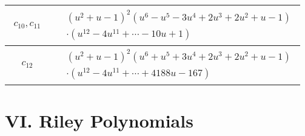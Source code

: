 \documentclass[1p]{elsarticle_modified}
\theoremstyle{definition}
\begin{document}
\begin{tabular}{m{50pt}|m{274pt}}
\hline $$\begin{aligned}c_{10},c_{11}\end{aligned}$$&$\begin{aligned}
&(u^2+u-1)^2(u^6- u^5-3 u^4+2 u^3+2 u^2+u-1)\\
&\cdot(u^{12}-4 u^{11}+\cdots-10 u+1)
\end{aligned}$\\
\hline $$\begin{aligned}c_{12}\end{aligned}$$&$\begin{aligned}
&(u^2+u-1)^2(u^6+u^5+3 u^4+2 u^3+2 u^2+u-1)\\
&\cdot(u^{12}-4 u^{11}+\cdots+4188 u-167)
\end{aligned}$\\
\hline
\end{tabular}\newpage\renewcommand{\arraystretch}{1}
\centering \section*{ VI. Riley Polynomials}
\end{document}
